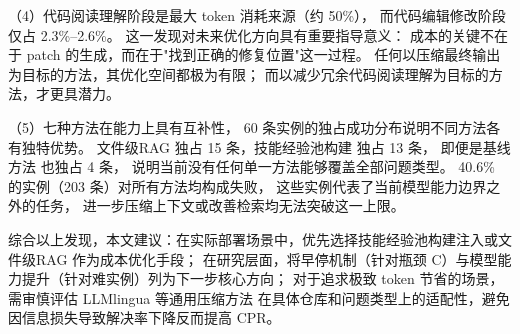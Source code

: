（4）代码阅读理解阶段是最大 token 消耗来源（约 50\%），
而代码编辑修改阶段仅占 2.3\%–2.6\%。
这一发现对未来优化方向具有重要指导意义：
成本的关键不在于 patch 的生成，而在于"找到正确的修复位置"这一过程。
任何以压缩最终输出为目标的方法，其优化空间都极为有限；
而以减少冗余代码阅读理解为目标的方法，才更具潜力。

（5）七种方法在能力上具有互补性，
60 条实例的独占成功分布说明不同方法各有独特优势。
文件级RAG 独占 15 条，技能经验池构建 独占 13 条，
即便是基线方法 也独占 4 条，
说明当前没有任何单一方法能够覆盖全部问题类型。
40.6\% 的实例（203 条）对所有方法均构成失败，
这些实例代表了当前模型能力边界之外的任务，
进一步压缩上下文或改善检索均无法突破这一上限。

综合以上发现，本文建议：在实际部署场景中，优先选择技能经验池构建注入或文件级RAG 作为成本优化手段；
在研究层面，将早停机制（针对瓶颈 C）与模型能力提升（针对难实例）列为下一步核心方向；
对于追求极致 token 节省的场景，需审慎评估 LLMlingua 等通用压缩方法
在具体仓库和问题类型上的适配性，避免因信息损失导致解决率下降反而提高 CPR。


